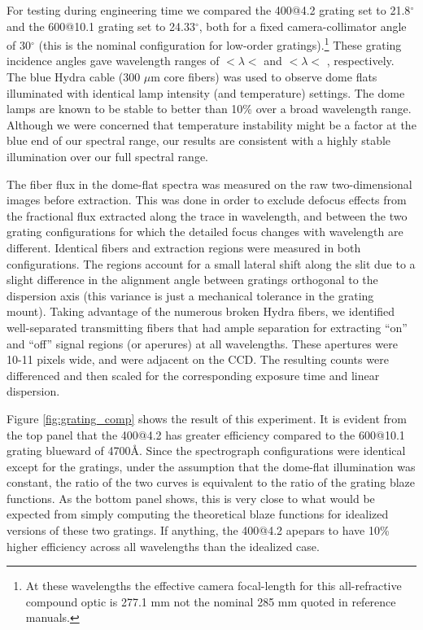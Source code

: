 \begin{appendices}
For testing during engineering time we compared the 400@4.2 grating
set to 21.8$^{\circ}$ and the 600@10.1 grating set to 24.33$^{\circ}$,
both for a fixed camera-collimator angle of 30$^{\circ}$ (this is the
nominal configuration for low-order gratings).\footnote{At these
  wavelengths the effective camera focal-length for this
  all-refractive compound optic is 277.1 mm not the nominal 285 mm
  quoted in reference manuals.} These grating incidence angles gave
wavelength ranges of $< \lambda <$  and
$< \lambda <$ , respectively. The blue
Hydra cable (300 $\mu$m core fibers) was used to observe dome flats
illuminated with identical lamp intensity (and temperature)
settings. The dome lamps are known to be stable to better than 10\%
over a broad wavelength range. Although we were concerned that
temperature instability might be a factor at the blue end of our
spectral range, our results are consistent with a highly stable
illumination over our full spectral range.

The fiber flux in the dome-flat spectra was measured on the raw
two-dimensional images before extraction. This was done in order to
exclude defocus effects from the fractional flux extracted along the
trace in wavelength, and between the two grating configurations for
which the detailed focus changes with wavelength are different.
Identical fibers and extraction regions were measured in both
configurations. The regions account for a small lateral shift along
the slit due to a slight difference in the alignment angle between
gratings orthogonal to the dispersion axis (this variance is just a
mechanical tolerance in the grating mount). Taking advantage of the
numerous broken Hydra fibers, we identified well-separated
transmitting fibers that had ample separation for extracting ``on''
and ``off'' signal regions (or aperures) at all wavelengths.  These
apertures were 10-11 pixels wide, and were adjacent on the CCD.  The
resulting counts were differenced and then scaled for the
corresponding exposure time and linear dispersion. 

Figure \ref{fig:grating_comp} shows the result of this experiment. It
is evident from the top panel that the 400@4.2 has greater efficiency
compared to the 600@10.1 grating blueward of 4700\AA. Since the
spectrograph configurations were identical except for the gratings,
under the assumption that the dome-flat illumination was constant, the
ratio of the two curves is equivalent to the ratio of the grating
blaze functions. As the bottom panel shows, this is very close to what
would be expected from simply computing the theoretical blaze
functions for idealized versions of these two gratings. If anything,
the 400@4.2 apepars to have 10\% higher efficiency across all
wavelengths than the idealized case.


\end{appendices}
